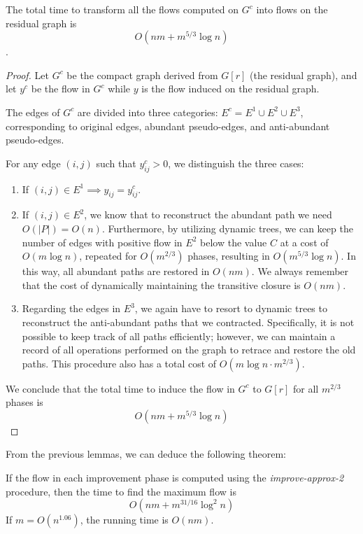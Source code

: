 \begin{lemma}
    The total time to transform all the flows computed on \( G^c \) into flows on the residual graph is 
    \[ O(nm + m^{5/3} \log n) \].
\end{lemma}
\begin{proof}
    Let \( G^c \) be the compact graph derived from \( G[r] \) (the residual graph), and let \( y^c \) be the flow in \( G^c \) while \( y \) is the flow induced on the residual graph.

    The edges of \( G^c \) are divided into three categories: \( E^c = E^1 \cup E^2 \cup E^3 \), corresponding to original edges, abundant pseudo-edges, and anti-abundant pseudo-edges.

    For any edge \( (i,j) \) such that \( y^c_{ij} > 0 \), we distinguish the three cases:
    \begin{enumerate}
        \item If \( (i,j) \in E^1 \implies y_{ij} = y^c_{ij} \).
        \item If \( (i,j) \in E^2 \), we know that to reconstruct the abundant path we need \( O(|P|) = O(n) \). Furthermore, by utilizing dynamic trees, we can keep the number of edges with positive flow in \( E^2 \) below the value \( C \) at a cost of \( O(m \log n) \), repeated for \( O(m^{2/3}) \) phases, resulting in \( O(m^{5/3} \log n) \). In this way, all abundant paths are restored in \( O(nm) \). We always remember that the cost of dynamically maintaining the transitive closure is \( O(nm) \).
        \item Regarding the edges in \( E^3 \), we again have to resort to dynamic trees to reconstruct the anti-abundant paths that we contracted. Specifically, it is not possible to keep track of all paths efficiently; however, we can maintain a record of all operations performed on the graph to retrace and restore the old paths. This procedure also has a total cost of \( O(m \log n \cdot m^{2/3}) \). 
    \end{enumerate}
    
    We conclude that the total time to induce the flow in \( G^c \) to \( G[r] \) for all \( m^{2/3} \) phases is 
    \[ O(nm + m^{5/3} \log n) \]
\end{proof}

From the previous lemmas, we can deduce the following theorem:

\begin{theorem}
    If the flow in each improvement phase is computed using the \textit{improve-approx-2} procedure, then the time to find the maximum flow is 
    \[ O(nm + m^{31/16} \log^2 n) \]
    If \( m = O(n^{1.06}) \), the running time is $O(nm)$.
\end{theorem}


\cleardoublepage